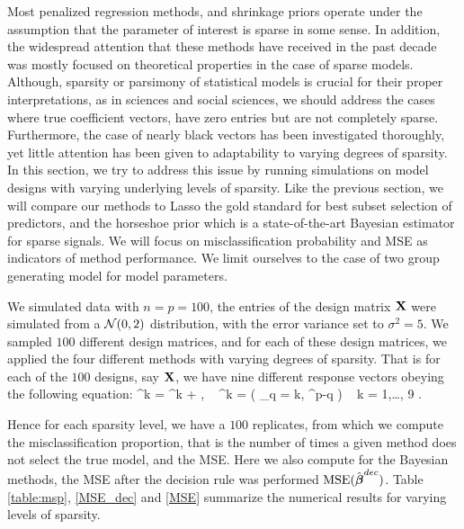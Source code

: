 \documentclass[10pt]{article}
\begin{document}
Most penalized regression methods, and shrinkage priors operate under the assumption that the parameter of interest is sparse in some sense. In addition, the widespread attention that these methods have received in the past decade was mostly focused on theoretical properties in the case of sparse models. Although, sparsity or parsimony of statistical models is crucial for their proper interpretations, as in sciences
and social sciences, we should address the cases where true coefficient vectors, have zero entries but are not completely sparse. Furthermore, the case of nearly black vectors has been investigated thoroughly, yet little attention has been given to adaptability to varying degrees of sparsity. In this section, we try to address this issue by running simulations on model designs with varying underlying levels of sparsity. Like the previous section, we will compare our methods to Lasso the gold standard for best subset selection of predictors, and the horseshoe prior which is a state-of-the-art Bayesian estimator for sparse signals. We will focus on misclassification probability and MSE as indicators of method performance. We limit ourselves to the case of two group generating model for model parameters. 

We simulated data with $n = p = 100$, the entries of the design matrix ${\bf X}$ were simulated from a $\mathcal{N}(0 ,2)$ distribution, with the error variance set to $\sigma^2 = 5 $. We sampled $100$ different design matrices, and for each of these design matrices, we applied the four different methods with varying degrees of sparsity. That is for each of the $100$ designs, say ${\bf X}$, we have nine different response vectors obeying the following equation:
\beq\label{sparsity_mod}
\y^{k} = \X \bbeta^{k} + \bepsilon, \  \bbeta^{k} =  ( _{q = k}, ^{p-q} ) \  k = 1,\ldots, 9 .
\eeq

Hence for each sparsity level, we have a $100$ replicates, from which we compute the misclassification proportion, that is the number of times a given method does not select the true model, and the MSE. Here we also compute for the Bayesian methods, the MSE after the decision rule was performed $\textbf{\rm{MSE}}(\hat{\boldsymbol{\beta}}^{dec})$. Table \ref{table:msp}, \ref{MSE_dec} and \ref{MSE} summarize the numerical results for varying levels of sparsity. 
\end{document}
